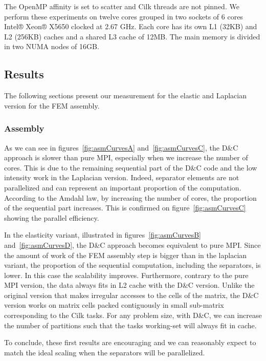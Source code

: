 \documentclass{IOS-Book-Article}
\begin{document}
The OpenMP affinity is set to scatter and Cilk threads are not pinned.
We perform these experiments on twelve cores grouped in two sockets of 6 cores Intel® Xeon® X5650 clocked at 2.67 GHz.
Each core has its own L1 (32KB) and L2 (256KB) caches and a shared L3 cache of 12MB. The main memory is divided in two NUMA nodes of 16GB.

\subsection{Results}
The following sections present our measurement for the elastic and Laplacian version for the FEM assembly.

\subsubsection{Assembly}
As we can see in figures~\ref{fig:asmCurvesA} and~\ref{fig:asmCurvesC}, the D\&C approach is slower than pure MPI, especially when we increase the number of cores.
This is due to the remaining sequential part of the D\&C code and the low intensity work in the Laplacian version.
Indeed, separator elements are not parallelized and can represent an important proportion of the computation.
According to the Amdahl law, by increasing the number of cores, the proportion of the sequential part increases.
This is confirmed on figure~\ref{fig:asmCurvesC} showing the parallel efficiency.

In the elasticity variant, illustrated in figures~\ref{fig:asmCurvesB} and~\ref{fig:asmCurvesD}, the D\&C approach becomes equivalent to pure MPI.
Since the amount of work of the FEM assembly step is bigger than in the laplacian variant, the proportion of the sequential computation, including the separators, is lower.
In this case the scalability improves. Furthermore, contrary to the pure MPI version, the data always fits in L2 cache with the D\&C version.
Unlike the original version that makes irregular accesses to the cells of the matrix, the D\&C version works on matrix cells packed contiguously in small sub-matrix corresponding to the Cilk tasks.
For any problem size, with D\&C, we can increase the number of partitions such that the tasks working-set will always fit in cache.

To conclude, these first results are encouraging and we can reasonably expect to match the ideal scaling when the separators will be parallelized.
\end{document}
